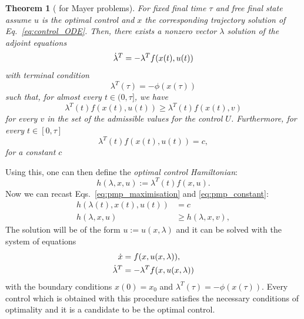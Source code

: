 \newtheorem{theorem}{Theorem}

\begin{theorem}[ for Mayer problems]\label{thm:pmp}
    For fixed final time $\tau$ and free final state assume $u$ is the optimal control and $x$ the corresponding trajectory solution of Eq.~\eqref{eq:control_ODE}. Then, there exists a nonzero vector $\lambda$ solution of the adjoint equations
  \begin{equation}
      \dot{\lambda}^T = - \lambda^T f(x(t), u(t))
  \end{equation}
  with terminal condition
  \begin{equation}
      \lambda^T(\tau) = -\phi(x(\tau))
  \end{equation}
  such that, for almost every $t \in (0, \tau]$, we have
  \begin{equation}\label{eq:pmp_maximisation}
      \lambda^T(t) f(x(t), u(t)) \geq \lambda^T(t) f(x(t), v)
  \end{equation}
  for every $v$ in the set of the admissible values for the control $U$. Furthermore, for every $t \in [0, \tau]$
  \begin{equation}\label{eq:pmp_constant}
      \lambda^T(t) f(x(t), u(t)) = c,
  \end{equation}
  for a constant $c$
\end{theorem}

Using this, one can then define the \emph{optimal control Hamiltonian}:
\begin{equation}
    h(\lambda, x, u) := \lambda^T(t) f(x, u).
\end{equation}
Now we can recast Eqs.~\eqref{eq:pmp_maximisation} and \eqref{eq:pmp_constant}:
\begin{equation}
    \begin{aligned}
        h(\lambda(t), x(t), u(t)) &= c \\
        h(\lambda, x, u) &\geq h(\lambda, x, v),
    \end{aligned}
\end{equation}
The solution will be of the form $u := u(x, \lambda)$ and it can be solved with the system of equations
\begin{equation}
    \begin{aligned}
        \dot{x} &= f(x, u(x, \lambda)), \\
        \dot{\lambda}^T &= -\lambda^T f(x, u(x, \lambda))
    \end{aligned}
\end{equation}
with the boundary conditions $x(0) = x_0$ and $\lambda^T(\tau) = -\phi(x(\tau))$. Every control which is obtained with this procedure satisfies the necessary conditions of optimality and it is a candidate to be the optimal control.

